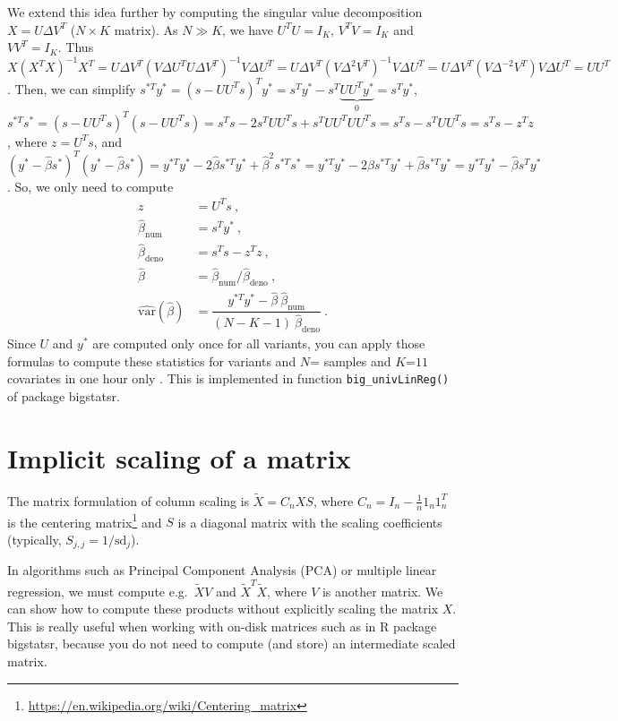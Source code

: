 We extend this idea further by computing the singular value decomposition $X = U \Delta V^T$ ($N \times K$ matrix). As $N \gg K$, we have $U^T U = I_K$, $V^T V  = I_K$ and $V V^T = I_K$. Thus $X (X^T X)^{-1} X^T = U \Delta V^T (V \Delta U^T U \Delta V^T)^{-1} V \Delta U^T = U \Delta V^T (V \Delta^2 V^T)^{-1} V \Delta U^T = U \Delta V^T (V \Delta^{-2} V^T) V \Delta U^T = U U^T$.
Then, we can simplify $s^{*T} y^* = (s - U U^T s)^T y^* = s^T y^* - s^T \underbrace{U U^T y^*}_0 = s^T y^*$, 
$s^{*T} s^* = (s - U U^T s)^T (s - U U^T s) = s^T s - 2 s^T U U^T s + s^T U U^T U U^T s = s^T s - s^T U U^T s = s^T s - z^T z$, where $z = U^T s$, 
and $(y^* - \hat{\beta} s^*)^T (y^* - \hat{\beta} s^*) = y^{*T} y^* - 2 \hat{\beta} s^{*T} y^* + \hat{\beta}^2 s^{*T} s^* = y^{*T} y^* - 2 \hat{\beta} s^{*T} y^* + \hat{\beta} s^{*T} y^* = y^{*T} y^* - \hat{\beta} s^{T} y^*$.
So, we only need to compute
\begin{align*}
z &= U^T s ~, \\
\hat{\beta}_{\text{num}} &= s^{T} y^* ~, \\
\hat{\beta}_{\text{deno}} &= s^T s - z^T z ~, \\
\hat{\beta} &= \hat{\beta}_{\text{num}} / \hat{\beta}_{\text{deno}} ~, \\
\widehat{\text{var}}(\hat{\beta}) &= \dfrac{y^{*T} y^* - \hat{\beta} ~ \hat{\beta}_{\text{num}}}{(N - K - 1) ~ \hat{\beta}_{\text{deno}}}~.
\end{align*}
Since $U$ and $y^*$ are computed only once for all variants, you can apply those formulas to compute these statistics for  variants and $N$= samples and $K$=$11$ covariates in one hour only \cite[]{prive2018efficient}. This is implemented in function \texttt{big\_univLinReg()} of package bigstatsr.


\section{Implicit scaling of a matrix}

The matrix formulation of column scaling is $\tilde{X} = C_n X S$, where $C_n = I_n - \frac{1}{n} 1_n 1_n^T$ is the centering matrix\footnote{\url{https://en.wikipedia.org/wiki/Centering_matrix}} and $S$ is a diagonal matrix with the scaling coefficients (typically, $S_{j,j} = 1 / \text{sd}_j$). 

In algorithms such as Principal Component Analysis (PCA) or multiple linear regression, we must compute e.g.\ $\tilde{X} V$ and $\tilde{X}^T \tilde{X}$, where $V$ is another matrix. We can show how to compute these products without explicitly scaling the matrix $X$. This is really useful when working with on-disk matrices such as in R package bigstatsr, because you do not need to compute (and store) an intermediate scaled matrix.

